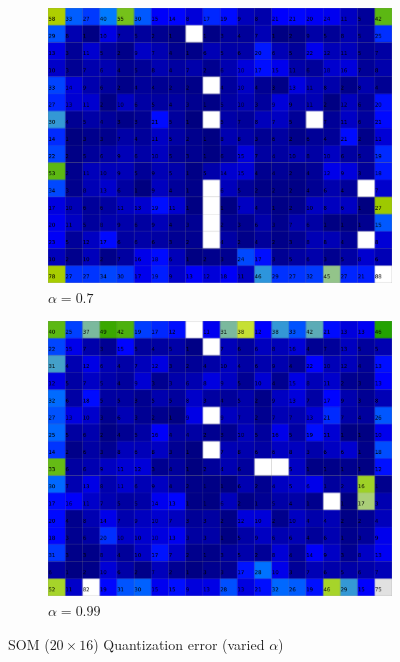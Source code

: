 \documentclass{acm_proc_article-sp}
\begin{document}
\begin{figure}
\begin{subfigure}[b]{0.24\linewidth}
    \end{subfigure}
    \begin{subfigure}[b]{0.24\linewidth}
        \includegraphics[width=\linewidth]{img/wine-20x16-quantization-error-alpha-0,7}
        \caption{$\alpha=0.7$}
        \label{fig:wine-20x16-quantization-error-alpha-0,7}
    \end{subfigure}
    \begin{subfigure}[b]{0.24\linewidth}
        \includegraphics[width=\linewidth]{img/wine-20x16-quantization-error-alpha-0,99}
        \caption{$\alpha=0.99$}
        \label{fig:wine-20x16-quantization-error-alpha-0,99}
    \end{subfigure}
    \caption{SOM ($20\times16$) Quantization error (varied $\alpha$)}
    \label{fig:wine-20x16-quantization-error-alpha}
\end{figure}
\end{document}
